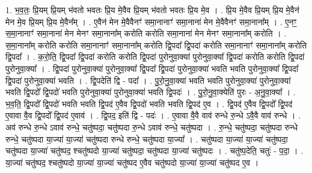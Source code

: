 \documentclass[17pt]{extarticle}
\begin{document}
1. भ॒व॒तः॒ प्रि॒यम् प्रि॒यम् भ॑वतो भवतः प्रि॒य मे॒वैव प्रि॒यम् भ॑वतो भवतः प्रि॒य मे॒व । . प्रि॒य मे॒वैव प्रि॒यम् प्रि॒य मे॒वैन॑ मेन मे॒व प्रि॒यम् प्रि॒य मे॒वैन᳚म् । . ए॒वैन॑ मेन मे॒वैवैनꣳ॑ समा॒नानाꣳ॑ समा॒नाना॑ मेन मे॒वैवैनꣳ॑ समा॒नाना᳚म् । . ए॒नꣳ॒॒ स॒मा॒नानाꣳ॑ समा॒नाना॑ मेन मेनꣳ समा॒नाना᳚म् करोति करोति समा॒नाना॑ मेन मेनꣳ समा॒नाना᳚म् करोति । . स॒मा॒नाना᳚म् करोति करोति समा॒नानाꣳ॑ समा॒नाना᳚म् करोति द्वि॒पदा᳚ द्वि॒पदा॑ करोति समा॒नानाꣳ॑ समा॒नाना᳚म् करोति द्वि॒पदा᳚ । . क॒रो॒ति॒ द्वि॒पदा᳚ द्वि॒पदा॑ करोति करोति द्वि॒पदा॑ पुरोनुवा॒क्या॑ पुरोनुवा॒क्या᳚ द्वि॒पदा॑ करोति करोति द्वि॒पदा॑ पुरोनुवा॒क्या᳚ । . द्वि॒पदा॑ पुरोनुवा॒क्या॑ पुरोनुवा॒क्या᳚ द्वि॒पदा᳚ द्वि॒पदा॑ पुरोनुवा॒क्या॑ भवति भवति पुरोनुवा॒क्या᳚ द्वि॒पदा᳚ द्वि॒पदा॑ पुरोनुवा॒क्या॑ भवति । . द्वि॒पदेति॑ द्वि - पदा᳚ । . पु॒रो॒नु॒वा॒क्या॑ भवति भवति पुरोनुवा॒क्या॑ पुरोनुवा॒क्या॑ भवति द्वि॒पदो᳚ द्वि॒पदो॑ भवति पुरोनुवा॒क्या॑ पुरोनुवा॒क्या॑ भवति द्वि॒पदः॑ । . पु॒रो॒नु॒वा॒क्येति॑ पुरः - अ॒नु॒वा॒क्या᳚ । . भ॒व॒ति॒ द्वि॒पदो᳚ द्वि॒पदो॑ भवति भवति द्वि॒पद॑ ए॒वैव द्वि॒पदो॑ भवति भवति द्वि॒पद॑ ए॒व । . द्वि॒पद॑ ए॒वैव द्वि॒पदो᳚ द्वि॒पद॑ ए॒वावा वै॒व द्वि॒पदो᳚ द्वि॒पद॑ ए॒वाव॑ । . द्वि॒पद॒ इति॑ द्वि - पदः॑ । . ए॒वावा वै॒वै वाव॑ रुन्धे रु॒न्धे ऽवै॒वै वाव॑ रुन्धे । . अव॑ रुन्धे रु॒न्धे ऽवाव॑ रुन्धे॒ चतु॑ष्पदा॒ चतु॑ष्पदा रु॒न्धे ऽवाव॑ रुन्धे॒ चतु॑ष्पदा । . रु॒न्धे॒ चतु॑ष्पदा॒ चतु॑ष्पदा रुन्धे रुन्धे॒ चतु॑ष्पदा या॒ज्या॑ या॒ज्या॑ चतु॑ष्पदा रुन्धे रुन्धे॒ चतु॑ष्पदा या॒ज्या᳚ । . चतु॑ष्पदा या॒ज्या॑ या॒ज्या॑ चतु॑ष्पदा॒ चतु॑ष्पदा या॒ज्या॑ चतु॑ष्पद॒ श्चतु॑ष्पदो या॒ज्या॑ चतु॑ष्पदा॒ चतु॑ष्पदा या॒ज्या॑ चतु॑ष्पदः । . चतु॑ष्प॒देति॒ चतुः॑ - प॒दा॒ । . या॒ज्या॑ चतु॑ष्पद॒ श्चतु॑ष्पदो या॒ज्या॑ या॒ज्या॑ चतु॑ष्पद ए॒वैव चतु॑ष्पदो या॒ज्या॑ या॒ज्या॑ चतु॑ष्पद ए॒व । \newline
\end{document}
